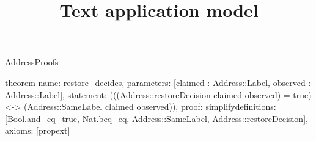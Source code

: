 \begin{lexlean}{AddressProofs}
\title{Text application model}
\begin{semanticmodule}
theorem{
  name: restore_decides,
  parameters: [claimed : Address::Label, observed : Address::Label],
  statement: (((Address::restoreDecision claimed observed) = true) <-> (Address::SameLabel claimed observed)),
  proof: simplify{definitions: [Bool.and_eq_true, Nat.beq_eq, Address::SameLabel, Address::restoreDecision]},
  axioms: [propext]
}
\end{semanticmodule}
\end{lexlean}
